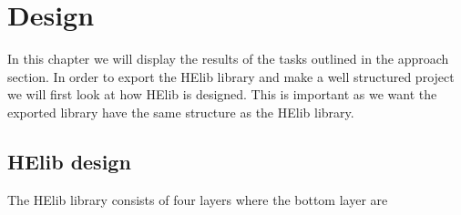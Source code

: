 

\afterpage{\blankpage}   %

\chapter{Design}
In this chapter we will display the results of the tasks outlined in the approach section. In order to export the HElib library and make a well structured project we will first look at how HElib is designed. This is important as we want the exported library have the same structure as the HElib library.

\section{HElib design}
The HElib library consists of four layers where the bottom layer are 
